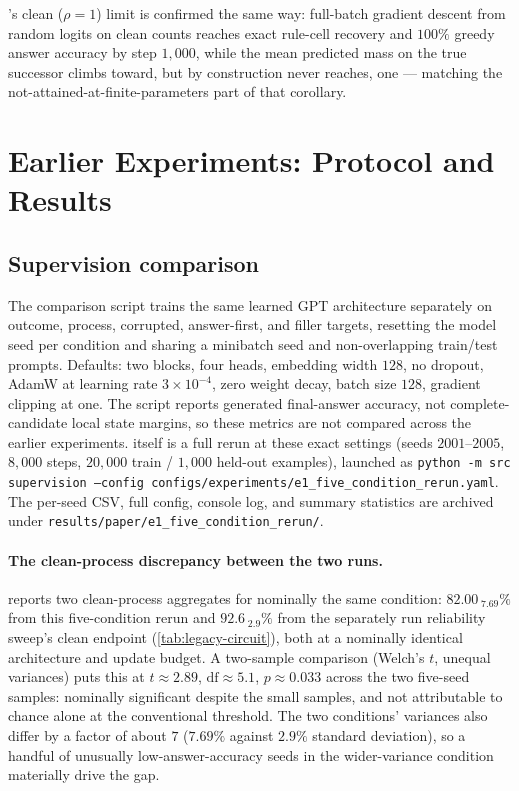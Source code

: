 's clean ($\rho=1$) limit is confirmed the same
way: full-batch gradient descent from random logits on clean counts
reaches exact rule-cell recovery and $100\%$ greedy answer accuracy by
step $1{,}000$, while the mean predicted mass on the true successor climbs
toward, but by construction never reaches, one --- matching the
not-attained-at-finite-parameters part of that corollary.

\section{Earlier Experiments: Protocol and Results}
\label{app:legacy-protocol}

\subsection{Supervision comparison}
\label{app:supervision-comparison-protocol}
The comparison script trains the same learned GPT architecture separately on
outcome, process, corrupted, answer-first, and filler targets, resetting the
model seed per condition and sharing a minibatch seed and non-overlapping
train/test prompts.  Defaults: two blocks, four heads, embedding width $128$,
no dropout, AdamW at learning rate $3\times10^{-4}$, zero weight decay, batch
size $128$, gradient clipping at one.  The script reports generated
final-answer accuracy, not complete-candidate local state margins, so these
metrics are not compared across the earlier experiments. 
itself is a full rerun at these exact settings (seeds $2001$--$2005$, $8{,}000$
steps, $20{,}000$ train / $1{,}000$ held-out examples), launched as
\texttt{python -m src supervision --config
configs/experiments/e1\_five\_condition\_rerun.yaml}. The per-seed CSV,
full config, console log, and summary statistics are archived under
\texttt{results/paper/e1\_five\_condition\_rerun/}.

\paragraph{The clean-process discrepancy between the two runs.}
 reports two clean-process aggregates for nominally
the same condition: $82.00_{\;\text{7.69}}\%$ from this five-condition
rerun and $92.6_{\;\text{2.9}}\%$ from the separately run reliability
sweep's clean endpoint (\cref{tab:legacy-circuit}), both at a nominally
identical architecture and update budget. A two-sample comparison
(Welch's $t$, unequal variances) puts this at $t\approx2.89$,
$\mathrm{df}\approx5.1$, $p\approx0.033$ across the two five-seed samples:
nominally significant despite the small samples, and not attributable to
chance alone at the conventional threshold. The two conditions' variances
also differ by a factor of about $7$ ($7.69\%$ against $2.9\%$ standard
deviation), so a handful of unusually low-answer-accuracy seeds in the
wider-variance condition materially drive the gap.

